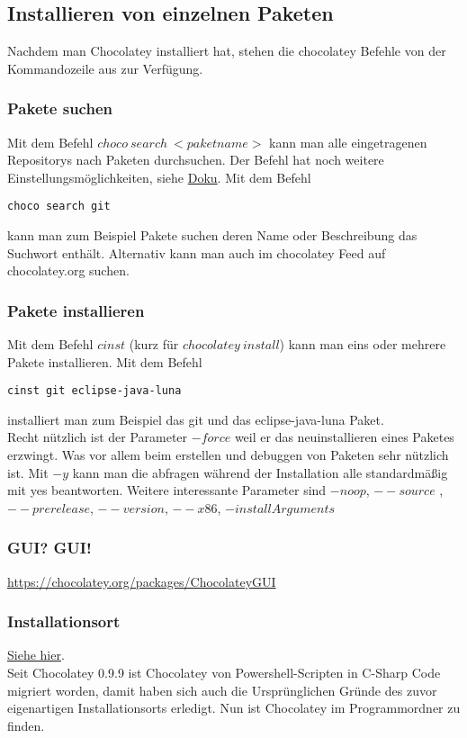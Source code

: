 \documentclass[10pt,a4paper]{article}
\begin{document}
\subsection{Installieren von einzelnen Paketen}
Nachdem man Chocolatey installiert hat, stehen die chocolatey Befehle von der Kommandozeile aus zur Verfügung.
\subsubsection{Pakete suchen}
Mit dem Befehl $choco~search~<paketname>$ kann man alle eingetragenen Repositorys nach Paketen durchsuchen. Der Befehl hat noch weitere Einstellungsmöglichkeiten, siehe \href{https://github.com/chocolatey/chocolatey/wiki/CommandsList}{Doku}. Mit dem Befehl 
\begin{lstlisting}
choco search git
\end{lstlisting}
kann man zum Beispiel Pakete suchen deren Name oder Beschreibung das Suchwort enthält. Alternativ kann man auch im chocolatey Feed auf chocolatey.org suchen.

\subsubsection{Pakete installieren}
Mit dem Befehl $cinst$ (kurz für $chocolatey~install$) kann man eins oder mehrere Pakete installieren.
Mit dem Befehl 
\begin{lstlisting}
cinst git eclipse-java-luna
\end{lstlisting}
installiert man zum Beispiel das git und das eclipse-java-luna Paket.\\
Recht nützlich ist der Parameter $-force$ weil er das neuinstallieren eines Paketes erzwingt. Was vor allem beim erstellen und debuggen von Paketen sehr nützlich ist.  Mit $-y$ kann man die abfragen während der Installation alle standardmäßig mit yes beantworten. Weitere interessante Parameter sind $-noop$, $--source$ , $--prerelease$, $--version$, $--x86$, $-installArguments$

\subsubsection{GUI? GUI!}
\url{https://chocolatey.org/packages/ChocolateyGUI}

\subsubsection{Installationsort}
\href{https://github.com/chocolatey/chocolatey/wiki/GettingStarted#where-are-chocolatey-packages-installed-to}{Siehe hier}.\\
Seit Chocolatey 0.9.9 ist Chocolatey von Powershell-Scripten in C-Sharp Code migriert worden, damit haben sich auch die Ursprünglichen Gründe des zuvor eigenartigen Installationsorts erledigt. Nun ist Chocolatey im Programmordner zu finden.
\end{document}
